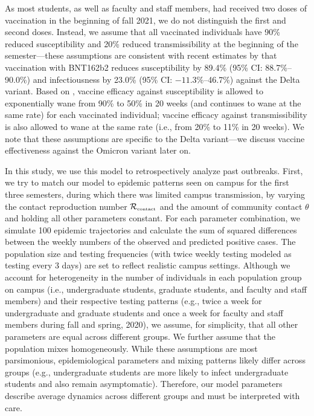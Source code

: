 \documentclass[12pt]{article}
\newcommand{\Rx}[1]{\ensuremath{{\mathcal R}_{#1}}}
\newcommand{\Rc}{\Rx{\textrm{\tiny{contact}}}}
\begin{document}
As most students, as well as faculty and staff members, had received two doses of vaccination in the beginning of fall 2021, we do not distinguish the first and second doses.
Instead, we assume that all vaccinated individuals have 90\% reduced susceptibility and 20\% reduced transmissibility at the beginning of the semester---these assumptions are consistent with recent estimates by \cite{prunas2022vaccination} that vaccination with BNT162b2 reduces susceptibility by 89.4\% (95\% CI: 88.7\%--90.0\%) and infectiousness by 23.0\% (95\% CI: $-11.3\%$--46.7\%) against the Delta variant.
Based on \cite{tartof2021effectiveness}, vaccine efficacy against susceptibility is allowed to exponentially wane from 90\% to 50\% in 20 weeks (and continues to wane at the same rate) for each vaccinated individual;
vaccine efficacy against transmissibility is also allowed to wane at the same rate (i.e., from 20\% to 11\% in 20 weeks).
We note that these assumptions are specific to the Delta variant---we discuss vaccine effectiveness against the Omicron variant later on.

In this study, we use this model to retrospectively analyze past outbreaks.
First, we try to match our model to epidemic patterns seen on campus for the first three semesters, during which there was limited campus transmission, by varying the contact reproduction number $\Rc$ and the amount of community contact $\theta$ and holding all other parameters constant.
For each parameter combination, we simulate 100 epidemic trajectories and calculate the sum of squared differences between the weekly numbers of the observed and predicted positive cases.
The population size and testing frequencies (with twice weekly testing modeled as testing every 3 days) are set to reflect realistic campus settings.
Although we account for heterogeneity in the number of individuals in each population group on campus (i.e., undergraduate students, graduate students, and faculty and staff members) and their respective testing patterns (e.g., twice a week for undergraduate and graduate students and once a week for faculty and staff members during fall and spring, 2020), we assume, for simplicity, that all other parameters are equal across different groups.
We further assume that the population mixes homogeneously.
While these assumptions are most parsimonious, epidemiological parameters and mixing patterns likely differ across groups (e.g., undergraduate students are more likely to infect undergraduate students and also remain asymptomatic).
Therefore, our model parameters describe average dynamics across different groups and must be interpreted with care.
\end{document}
